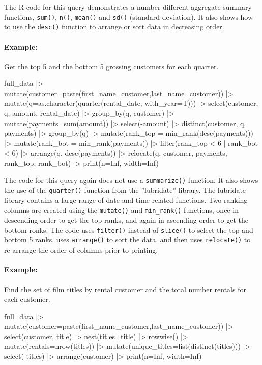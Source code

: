The R code for this query demonstrates a number different aggregate summary functions, \texttt{sum()}, \texttt{n()}, \texttt{mean()} and \texttt{sd()} (standard deviation). It also shows how to use the \texttt{desc()} function to arrange or sort data in decreasing order.

\paragraph*{Example:} Get the top 5 and the bottom 5 grossing customers for each quarter.

\begin{samepage}
\begin{Rcode}
full_data |>
  mutate(customer=paste(first_name_customer,last_name_customer)) |>
  mutate(q=as.character(quarter(rental_date, with_year=T))) |>
  select(customer, q, amount, rental_date) |>
  group_by(q, customer) |>
  mutate(payments=sum(amount)) |>
  select(-amount) |>
  distinct(customer, q, payments) |>
  group_by(q) |>
  mutate(rank_top = min_rank(desc(payments))) |>
  mutate(rank_bot = min_rank(payments)) |>
  filter(rank_top < 6 | rank_bot < 6) |>
  arrange(q, desc(payments)) |>
  relocate(q, customer, payments, rank_top, rank_bot) |>
  print(n=Inf, width=Inf)
\end{Rcode}
\end{samepage}

The code for this query again does not use a \texttt{summarize()} function. It also shows the use of the \texttt{quarter()} function from the ''lubridate'' library. The lubridate library contains a large range of date and time related functions. Two ranking columns are created using the \texttt{mutate()} and \texttt{min\_rank()} functions, once in descending order to get the top ranks, and again in ascending order to get the bottom ronks. The code uses \texttt{filter()} instead of \texttt{slice()} to select the top and bottom 5 ranks, uses \texttt{arrange()} to sort the data, and then uses \texttt{relocate()} to re-arrange the order of columns prior to printing.

\paragraph*{Example:} Find the set of film titles by rental customer and the total number rentals for each customer.

\begin{samepage}
\begin{Rcode}
full_data |>
  mutate(customer=paste(first_name_customer,last_name_customer)) |>
  select(customer, title) |>
  nest(titles=title) |>
  rowwise() |> 
  mutate(rentals=nrow(titles)) |>
  mutate(unique_titles=list(distinct(titles))) |>
  select(-titles) |>
  arrange(customer) |>
  print(n=Inf, width=Inf)
\end{Rcode}
\end{samepage}

